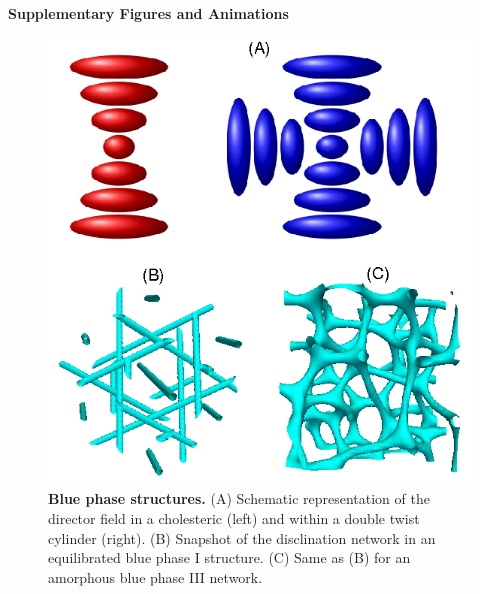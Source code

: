 \documentclass[12pt,twoside]{article}
\begin{document}
\vfill\pagebreak


{\bf Supplementary Figures and Animations}

\begin{figure}[!h]
\begin{center}
\includegraphics[scale=0.8]{support-fig1.png}
\end{center}
\caption{\textbf{Blue phase structures.}
(A) Schematic representation of the director field
in a cholesteric (left) and within a double twist cylinder (right).
(B) Snapshot of the disclination network in an equilibrated 
blue phase I structure. (C) Same as (B) for an amorphous blue phase III
network.}
\end{figure}

\newpage
\end{document}
